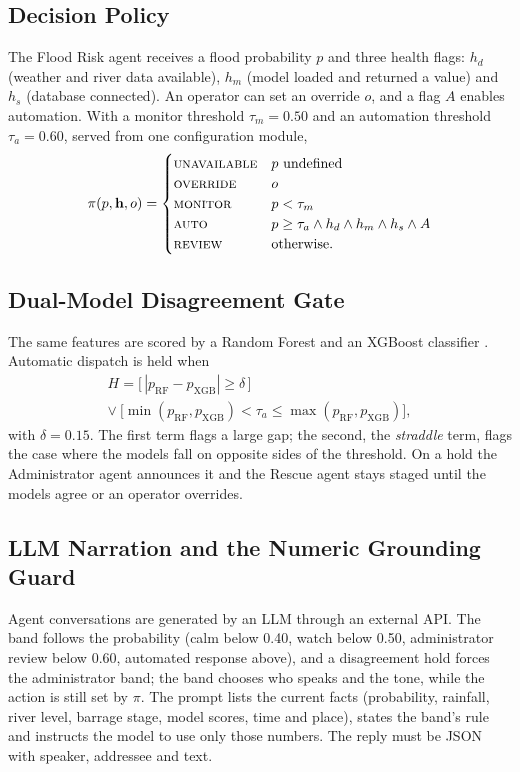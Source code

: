 \documentclass[conference]{IEEEtran}
\begin{document}
\subsection{Decision Policy}
The Flood Risk agent receives a flood probability $p$ and three health flags: $h_d$ (weather and river data available), $h_m$ (model loaded and returned a value) and $h_s$ (database connected). An operator can set an override $o$, and a flag $A$ enables automation. With a monitor threshold $\tau_m=0.50$ and an automation threshold $\tau_a=0.60$, served from one configuration module,
\begin{equation}
\pi(p,\mathbf{h},o)=
\begin{cases}
\textsc{unavailable} & p \text{ undefined}\\
\textsc{override} & o\\
\textsc{monitor} & p<\tau_m\\
\textsc{auto} & p\ge\tau_a \wedge h_d\wedge h_m\wedge h_s\wedge A\\
\textsc{review} & \text{otherwise.}
\end{cases}
\label{eq:policy}
\end{equation}

\subsection{Dual-Model Disagreement Gate}
The same features are scored by a Random Forest \cite{Breiman2001} and an XGBoost classifier \cite{Chen2016}. Automatic dispatch is held when
\begin{multline}
H=\big[\,|p_{\mathrm{RF}}-p_{\mathrm{XGB}}|\ge\delta\,\big]\\
\vee\ \big[\min(p_{\mathrm{RF}},p_{\mathrm{XGB}})<\tau_a\le\max(p_{\mathrm{RF}},p_{\mathrm{XGB}})\big],
\label{eq:dual}
\end{multline}
with $\delta=0.15$. The first term flags a large gap; the second, the \emph{straddle} term, flags the case where the models fall on opposite sides of the threshold. On a hold the Administrator agent announces it and the Rescue agent stays staged until the models agree or an operator overrides.

\subsection{LLM Narration and the Numeric Grounding Guard}
Agent conversations are generated by an LLM through an external API. The band follows the probability (calm below 0.40, watch below 0.50, administrator review below 0.60, automated response above), and a disagreement hold forces the administrator band; the band chooses who speaks and the tone, while the action is still set by $\pi$. The prompt lists the current facts (probability, rainfall, river level, barrage stage, model scores, time and place), states the band's rule and instructs the model to use only those numbers. The reply must be JSON with speaker, addressee and text.
\end{document}
